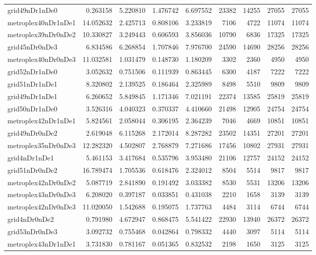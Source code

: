 \begin{longtable}{|l|r|r|r|r|r|r|r|r|}
grid49nDr1nDe0 & 0.263158 & 5.220810 & 1.476742 & 6.697552 & 23382 & 14255 & 27055 & 27055 \\
metroplex40nDr1nDe1 & 14.052632 & 2.425713 & 0.808106 & 3.233819 & 7106 & 4722 & 11074 & 11074 \\
metroplex39nDr0nDe2 & 10.330827 & 3.249443 & 0.606593 & 3.856036 & 10790 & 6836 & 17325 & 17325 \\
grid45nDr0nDe3 & 6.834586 & 6.268854 & 1.707846 & 7.976700 & 24590 & 14690 & 28256 & 28256 \\
metroplex40nDr0nDe3 & 11.032581 & 1.031479 & 0.148730 & 1.180209 & 3302 & 2360 & 4950 & 4950 \\
grid52nDr1nDe0 & 3.052632 & 0.751506 & 0.111939 & 0.863445 & 6300 & 4187 & 7222 & 7222 \\
grid51nDr1nDe1 & 8.320802 & 2.139525 & 0.186464 & 2.325989 & 8498 & 5510 & 9809 & 9809 \\
grid49nDr1nDe1 & 6.260652 & 5.849845 & 1.171346 & 7.021191 & 22374 & 13585 & 25819 & 25819 \\
grid50nDr1nDe0 & 3.526316 & 4.040323 & 0.370337 & 4.410660 & 21498 & 12905 & 24754 & 24754 \\
metroplex42nDr1nDe1 & 5.824561 & 2.058044 & 0.306195 & 2.364239 & 7046 & 4669 & 10851 & 10851 \\
grid49nDr0nDe2 & 2.619048 & 6.115268 & 2.172014 & 8.287282 & 23502 & 14351 & 27201 & 27201 \\
metroplex35nDr0nDe3 & 12.282320 & 4.502807 & 2.768879 & 7.271686 & 17456 & 10802 & 27931 & 27931 \\
grid4nDr1nDe1 & 5.461153 & 3.417684 & 0.535796 & 3.953480 & 21106 & 12757 & 24152 & 24152 \\
grid51nDr0nDe2 & 16.789474 & 1.705536 & 0.618476 & 2.324012 & 8504 & 5514 & 9817 & 9817 \\
metroplex42nDr0nDe2 & 5.087719 & 2.841890 & 0.191492 & 3.033382 & 8530 & 5531 & 13206 & 13206 \\
metroplex43nDr0nDe3 & 6.208020 & 0.397187 & 0.033851 & 0.431038 & 2210 & 1658 & 3139 & 3139 \\
metroplex42nDr0nDe3 & 11.020050 & 1.542688 & 0.195075 & 1.737763 & 4484 & 3114 & 6744 & 6744 \\
grid4nDr0nDe2 & 0.791980 & 4.672947 & 0.868475 & 5.541422 & 22930 & 13940 & 26372 & 26372 \\
grid53nDr0nDe3 & 3.092732 & 0.755468 & 0.042864 & 0.798332 & 4440 & 3097 & 5114 & 5114 \\
metroplex43nDr1nDe1 & 3.731830 & 0.781167 & 0.051365 & 0.832532 & 2198 & 1650 & 3125 & 3125 \\

\end{longtable}
